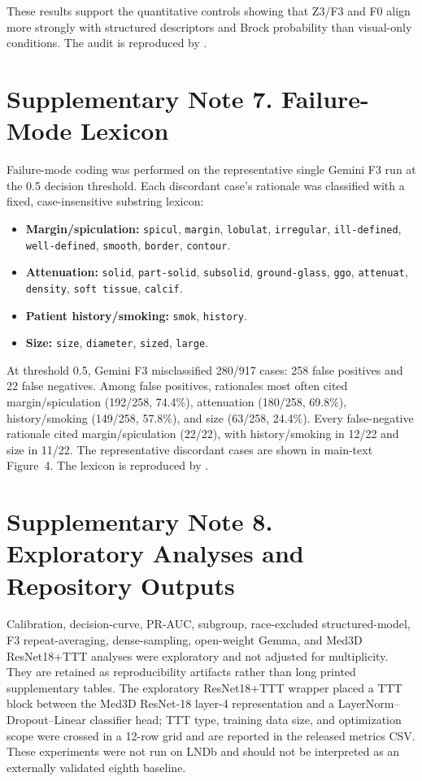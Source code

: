 \documentclass[11pt]{article}
\begin{document}
These results support the quantitative controls showing that Z3/F3 and F0 align
more strongly with structured descriptors and Brock probability than visual-only
conditions. The audit is reproduced by .

\section*{Supplementary Note 7. Failure-Mode Lexicon}

Failure-mode coding was performed on the representative single Gemini F3 run at
the 0.5 decision threshold. Each discordant case's rationale was classified with
a fixed, case-insensitive substring lexicon:

\begin{itemize}
\item \textbf{Margin/spiculation:} \texttt{spicul}, \texttt{margin},
\texttt{lobulat}, \texttt{irregular}, \texttt{ill-defined},
\texttt{well-defined}, \texttt{smooth}, \texttt{border}, \texttt{contour}.
\item \textbf{Attenuation:} \texttt{solid}, \texttt{part-solid},
\texttt{subsolid}, \texttt{ground-glass}, \texttt{ggo}, \texttt{attenuat},
\texttt{density}, \texttt{soft tissue}, \texttt{calcif}.
\item \textbf{Patient history/smoking:} \texttt{smok}, \texttt{history}.
\item \textbf{Size:} \texttt{size}, \texttt{diameter}, \texttt{sized},
\texttt{large}.
\end{itemize}

At threshold 0.5, Gemini F3 misclassified 280/917 cases: 258 false positives and
22 false negatives. Among false positives, rationales most often cited
margin/spiculation (192/258, 74.4\%), attenuation (180/258, 69.8\%),
history/smoking (149/258, 57.8\%), and size (63/258, 24.4\%). Every
false-negative rationale cited margin/spiculation (22/22), with history/smoking
in 12/22 and size in 11/22. The representative discordant cases are shown in
main-text Figure~4. The lexicon is reproduced by
.

\section*{Supplementary Note 8. Exploratory Analyses and Repository Outputs}

Calibration, decision-curve, PR-AUC, subgroup, race-excluded structured-model,
F3 repeat-averaging, dense-sampling, open-weight Gemma, and Med3D ResNet18+TTT
analyses were exploratory and not adjusted for multiplicity. They are retained
as reproducibility artifacts rather than long printed supplementary tables. The
exploratory ResNet18+TTT wrapper placed a TTT block between the Med3D ResNet-18
layer-4 representation and a LayerNorm--Dropout--Linear classifier head; TTT
type, training data size, and optimization scope were crossed in a 12-row grid
and are reported in the released metrics CSV. These experiments were not run on
LNDb and should not be interpreted as an externally validated eighth baseline.
\end{document}
